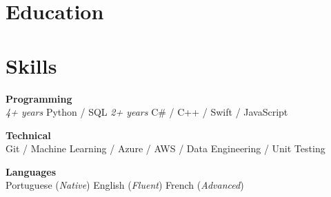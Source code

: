 \documentclass[10pt]{aqresume}
\begin{document}
  \section{Education}

  \section{Skills}
    \vspace*{-1\multicolsep}
    \begin{multicols*}{3}
      []
      \raggedright\textbf{Programming}\\
      \textit{4+ years} Python / SQL\newline
      \textit{2+ years} C# / C++ / Swift / JavaScript
      \vfill\null
      \columnbreak

      \textbf{Technical}\\
      Git / Machine Learning / Azure / AWS / Data Engineering / Unit Testing
      \vfill\null
      \columnbreak

      \textbf{Languages}\\
      Portuguese (\textit{Native})\newline
      English (\textit{Fluent})\newline
      French (\textit{Advanced})
    \end{multicols*}
\end{document}
